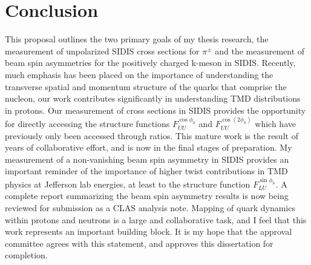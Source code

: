 \section{Conclusion}

This proposal outlines the two primary goals of my thesis research, the measurement of unpolarized SIDIS cross sections for $\pi^{\pm}$ and the measurement of beam spin asymmetries for the positively charged k-meson in SIDIS.  Recently, much emphasis has been placed on the importance of understanding the transverse spatial and momentum structure of the quarks that comprise the nucleon, our work contributes significantly in understanding TMD distributions in protons.  Our measurement of cross sections in SIDIS provides the opportunity for directly accessing the structure functions $F_{UU}^{\cos\phi_h}$ and $F_{UU}^{\cos(2\phi_h)}$ which have previously only been accessed through ratios.  This mature work is the result of years of collaborative effort, and is now in the final stages of preparation.  My measurement of a non-vanishing beam spin asymmetry in SIDIS provides an important reminder of the importance of higher twist contributions in TMD physics at Jefferson lab energies, at least to the structure function $F_{LU}^{\sin\phi_h}$.  A complete report summarizing the beam spin asymmetry results is now being reviewed for submission as a CLAS analysis note.  Mapping of quark dynamics within protons and neutrons is a large and collaborative task, and I feel that this work represents an important building block.  It is my hope that the approval committee agrees with this statement, and approves this dissertation for completion. 
